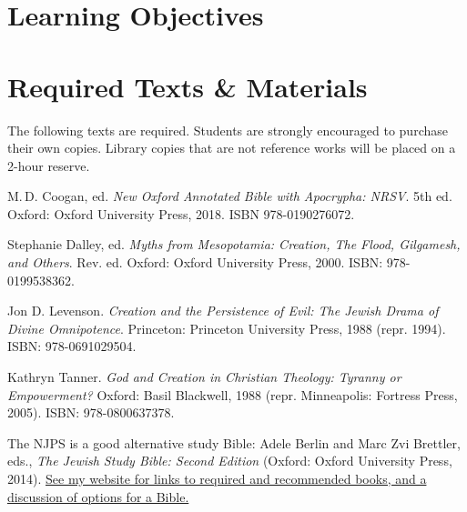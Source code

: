 \documentclass[titlepage]{article}
\newcommand\incl{../includes}
\begin{document}


  \section{Learning Objectives}
  \label{objectives}

  \edobject

\section{Required Texts \& Materials}
\label{texts}

The following texts are required. Students are strongly encouraged to
purchase their own copies. Library copies that are not reference works
will be placed on a 2-hour reserve.

\begingroup
\renewcommand{\section}[2]{}%
\begin{thebibliography}{Levenson}%

	 M.\,D. Coogan, ed.
    \emph{New Oxford Annotated Bible with Apocrypha: NRSV}. 5th ed.
    Oxford: Oxford University Press, 2018.
    ISBN 978-0190276072.

	 Stephanie Dalley, ed.
	\emph{Myths from Mesopotamia: Creation, The Flood, Gilgamesh, and Others}. Rev. ed.
	Oxford: Oxford University Press, 2000.
	ISBN: 978-0199538362.

	 Jon D. Levenson.
	\emph{Creation and the Persistence of Evil: The Jewish Drama of Divine Omnipotence}.
	Princeton: Princeton University Press, 1988 (repr. 1994).
	ISBN: 978-0691029504.

	 Kathryn Tanner.
	\emph{God and Creation in Christian Theology: Tyranny or Empowerment?}
	Oxford: Basil Blackwell, 1988 (repr. Minneapolis: Fortress Press, 2005).
	ISBN: 978-0800637378.

\end{thebibliography}
\endgroup

The NJPS is a good alternative study Bible: Adele Berlin and Marc Zvi
Brettler, eds., \emph{The Jewish Study Bible: Second Edition} (Oxford:
Oxford University Press, 2014). \href{https://danieldriver.com/courses/hb-3117/}{See
my website for links to required and recommended books, and a discussion
of options for a Bible.}
\end{document}
